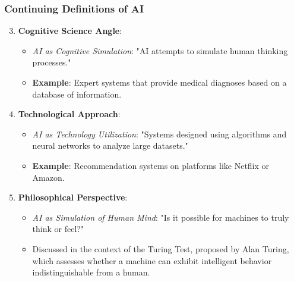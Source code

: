 \documentclass[aspectratio=169]{beamer}
\begin{document}
\begin{frame}[fragile]
    \frametitle{Continuing Definitions of AI}
    \begin{enumerate}
        \setcounter{enumii}{2}
        \item \textbf{Cognitive Science Angle}:
        \begin{itemize}
            \item \textit{AI as Cognitive Simulation}: "AI attempts to simulate human thinking processes."
            \item \textbf{Example}: Expert systems that provide medical diagnoses based on a database of information.
        \end{itemize}
        
        \item \textbf{Technological Approach}:
        \begin{itemize}
            \item \textit{AI as Technology Utilization}: "Systems designed using algorithms and neural networks to analyze large datasets."
            \item \textbf{Example}: Recommendation systems on platforms like Netflix or Amazon.
        \end{itemize}
        
        \item \textbf{Philosophical Perspective}:
        \begin{itemize}
            \item \textit{AI as Simulation of Human Mind}: "Is it possible for machines to truly think or feel?"
            \item Discussed in the context of the Turing Test, proposed by Alan Turing, which assesses whether a machine can exhibit intelligent behavior indistinguishable from a human.
        \end{itemize}
    \end{enumerate}
\end{frame}
\end{document}
